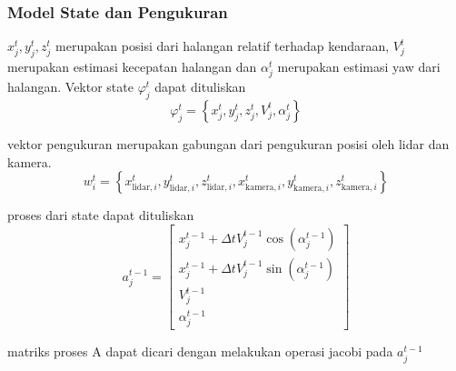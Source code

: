 \begin{frame}[allowframebreaks]
    \frametitle{Model State dan Pengukuran}
    \justifying
    $x_{j}^{t}, y_{j}^{t}, z_{j}^{t}$ merupakan posisi dari halangan relatif terhadap kendaraan, $V_{j}^{t}$ merupakan estimasi kecepatan halangan dan $\alpha_{j}^{t}$ merupakan estimasi yaw dari halangan. Vektor state $\varphi_{j}^{t}$ dapat dituliskan
    \begin{equation}
        \varphi_{j}^{t}=\left\{x_{j}^{t}, y_{j}^{t}, z_{j}^{t}, V_{j}^{t}, \alpha_{j}^{t}\right\}
    \end{equation}

    vektor pengukuran merupakan gabungan dari pengukuran posisi oleh lidar dan kamera.
    \begin{equation}
        w_{i}^{t}=\left\{x_{\text{lidar}, i}^{t}, y_{\text{lidar}, i}^{t}, z_{\text{lidar},i}^{t}, x_{\text{kamera}, i}^{t}, y_{\text{kamera}, i}^{t}, z_{\text{kamera},i}^{t}\right\}
    \end{equation}

    proses dari state dapat dituliskan
    \begin{equation}
        a_{j}^{t-1}=\left[\begin{array}{c}
        x_{j}^{t-1}+\Delta t V_{j}^{t-1} \cos \left(\alpha_{j}^{t-1}\right) \\
        x_{j}^{t-1}+\Delta t V_{j}^{t-1} \sin \left(\alpha_{j}^{t-1}\right) \\
        V_{j}^{t-1} \\
        \alpha_{j}^{t-1}
        \end{array}\right]
    \end{equation}

    matriks proses A dapat dicari dengan melakukan operasi jacobi pada $a_{j}^{t-1}$


\end{frame}
